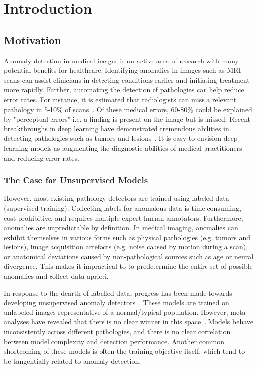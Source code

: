 \chapter{Introduction}

\section{Motivation}

Anomaly detection in medical images is an active area of research with many potential benefits for healthcare. Identifying anomalies in images such as MRI scans can assist clinicians in detecting conditions earlier and initiating treatment more rapidly. Further, automating the detection of pathologies can help reduce error rates. For instance, it is estimated that radiologists can miss a relevant pathology in 5-10\% of scans~\cite{bruno_understanding_2015}. Of these medical errors, 60-80\% could be explained by "perceptual errors" i.e. a finding is present on the image but is missed. Recent breakthroughs in deep learning have demonstrated tremendous abilities in detecting pathologies such as tumors and lesions~\cite{kim_deep_2019,lee_deep_2017}. It is easy to envision deep learning models as augmenting the diagnostic abilities of medical practitioners and reducing error rates.


\subsection*{The Case for Unsupervised Models}

However, most existing pathology detectors are trained using labeled data (supervised training). Collecting labels for anomalous data is time consuming, cost prohibitive, and requires multiple expert human annotators.  Furthermore, anomalies are unpredictable by definition. In medical imaging, anomalies can exhibit themselves in various forms such as physical pathologies (e.g. tumors and lesions), image acquisition artefacts (e.g. noise caused by motion during a scan), or anatomical deviations caused by non-pathological sources such as age or neural divergence.
This makes it impractical to to predetermine the entire set of possible anomalies and collect data apriori.

In response to the dearth of labelled data, progress has been made towards developing unsupervised anomaly detectors~\cite{bergmann2020uninformed,baur_deep_2019,ruff_unifying_2021}. These models are trained on unlabeled images representative of a normal/typical population.
However, meta-analyses have revealed that there is no clear winner in this space~\cite{baur2021,ruff_unifying_2021}. Models behave inconsistently across different pathologies, and there is no clear correlation between model complexity and detection performance. Another common shortcoming of these models is often the training objective itself, which tend to be tangentially related to anomaly detection.

